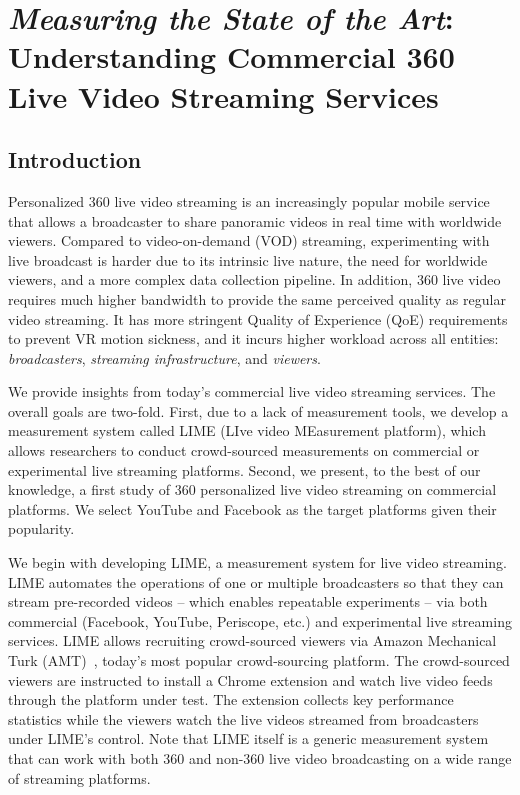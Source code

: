 \chapter{\emph{Measuring the State of the Art}: Understanding Commercial 360\degree{} Live Video Streaming Services} \label{chap:360video}



\section{Introduction}
Personalized 360\degree{} live video streaming is an increasingly popular mobile service that allows a broadcaster to share panoramic videos in real time with worldwide viewers. Compared to video-on-demand (VOD) streaming, experimenting with live broadcast is harder due to its intrinsic live nature, the need for worldwide viewers, and a more complex data collection pipeline. In addition, 360\degree{} live video requires much higher bandwidth to provide the same perceived quality as regular
video streaming. It has more
stringent Quality of Experience (QoE) requirements to prevent VR
motion sickness, and it incurs higher workload across all entities:
\emph{broadcasters}, \emph{streaming infrastructure}, and \emph{viewers}.


We provide insights from today’s commercial live video streaming services. The overall goals are two-fold. First, due to
a lack of measurement tools, we develop a measurement system
called LIME (LIve video MEasurement platform), which allows researchers
to conduct crowd-sourced measurements on commercial
or experimental live streaming platforms. Second, we present, to
the best of our knowledge, a first study of 360\degree{} personalized live
video streaming on commercial platforms. We select YouTube and
Facebook as the target platforms given their popularity.

We begin with developing LIME, a measurement system for live
video streaming. LIME automates the operations of one or multiple
broadcasters so that they can stream pre-recorded videos --
which enables repeatable experiments -- via both commercial (Facebook,
YouTube, Periscope, etc.) and experimental live streaming services.
LIME allows recruiting crowd-sourced viewers via Amazon
Mechanical Turk (AMT)~\cite{amt}, today’s most popular crowd-sourcing
platform. The crowd-sourced viewers are instructed to install a
Chrome extension and watch live video feeds through the platform
under test. The extension collects key performance statistics
while the viewers watch the live videos streamed from broadcasters
under LIME’s control. Note that LIME itself is a generic measurement
system that can work with both 360\degree{} and non-360\degree{} live video
broadcasting on a wide range of streaming platforms.

